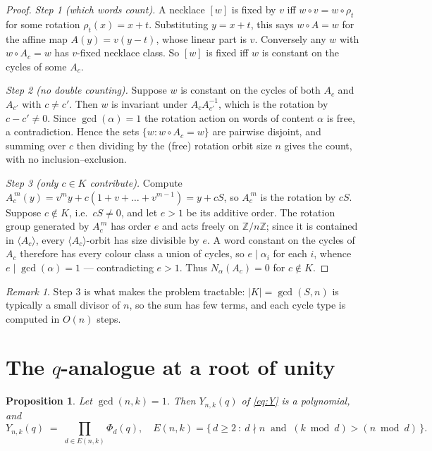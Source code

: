 \documentclass[11pt,a4paper]{article}
\providecommand{\texorpdfstring}[2]{#1}   %
\theoremstyle{plain}
\newtheorem{proposition}[theorem]{Proposition}
\theoremstyle{definition}
\theoremstyle{remark}
\newtheorem{remark}[theorem]{Remark}
\newcommand{\Z}{\mathbb{Z}}
\newcommand{\Zn}{\Z/n\Z}
\begin{document}
\begin{proof}
\emph{Step 1 (which words count).} A necklace $[w]$ is fixed by $v$ iff $w\circ v=w\circ
\rho_t$ for some rotation $\rho_t(x)=x+t$. Substituting $y=x+t$, this says $w\circ A=w$ for
the affine map $A(y)=v(y-t)$, whose linear part is $v$. Conversely any $w$ with $w\circ
A_c=w$ has $v$-fixed necklace class. So $[w]$ is fixed iff $w$ is constant on the cycles of
some $A_c$.

\emph{Step 2 (no double counting).} Suppose $w$ is constant on the cycles of both $A_c$ and
$A_{c'}$ with $c\ne c'$. Then $w$ is invariant under $A_cA_{c'}^{-1}$, which is the rotation
by $c-c'\ne 0$. Since $\gcd(\alpha)=1$ the rotation action on words of content $\alpha$ is
free, a contradiction. Hence the sets $\{w: w\circ A_c=w\}$ are pairwise disjoint, and
summing over $c$ then dividing by the (free) rotation orbit size $n$ gives the count, with
no inclusion--exclusion.

\emph{Step 3 (only $c\in K$ contribute).} Compute
$A_c^{\,m}(y)=v^{m}y+c(1+v+\dots+v^{m-1})=y+cS$, so $A_c^{\,m}$ is the rotation by $cS$.
Suppose $c\notin K$, i.e.\ $cS\ne 0$, and let $e>1$ be its additive order. The rotation
group generated by $A_c^{\,m}$ has order $e$ and acts freely on $\Zn$; since it is contained
in $\langle A_c\rangle$, every $\langle A_c\rangle$-orbit has size divisible by $e$. A word
constant on the cycles of $A_c$ therefore has every colour class a union of cycles, so
$e\mid\alpha_i$ for each $i$, whence $e\mid\gcd(\alpha)=1$ --- contradicting $e>1$. Thus
$N_\alpha(A_c)=0$ for $c\notin K$.
\end{proof}

\begin{remark}
Step 3 is what makes the problem tractable: $|K|=\gcd(S,n)$ is typically a small divisor of
$n$, so the sum has few terms, and each cycle type is computed in $O(n)$ steps.
\end{remark}

\section{The \texorpdfstring{$q$}{q}-analogue at a root of unity}\label{sec:eval}

\begin{proposition}\label{prop:factor}
Let $\gcd(n,k)=1$. Then $Y_{n,k}(q)$ of \eqref{eq:Y} is a polynomial, and
\[
  Y_{n,k}(q)\;=\;\prod_{d\in E(n,k)}\Phi_d(q),
  \quad
  E(n,k)=\bigl\{\,d\ge 2\ :\ d\nmid n \ \text{ and }\ (k\bmod d)>(n\bmod d)\,\bigr\}.
\]
\end{proposition}
\end{document}
